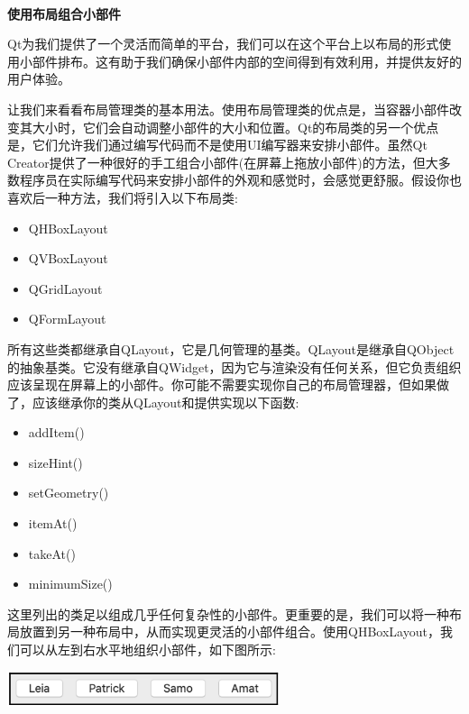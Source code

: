 \noindent\textbf{}\ \par
\textbf{使用布局组合小部件} \ \par
Qt为我们提供了一个灵活而简单的平台，我们可以在这个平台上以布局的形式使用小部件排布。这有助于我们确保小部件内部的空间得到有效利用，并提供友好的用户体验。 \par
让我们来看看布局管理类的基本用法。使用布局管理类的优点是，当容器小部件改变其大小时，它们会自动调整小部件的大小和位置。Qt的布局类的另一个优点是，它们允许我们通过编写代码而不是使用UI编写器来安排小部件。虽然Qt Creator提供了一种很好的手工组合小部件(在屏幕上拖放小部件)的方法，但大多数程序员在实际编写代码来安排小部件的外观和感觉时，会感觉更舒服。假设你也喜欢后一种方法，我们将引入以下布局类: \par

\begin{itemize}
	\item QHBoxLayout
	\item QVBoxLayout
	\item QGridLayout
	\item QFormLayout
\end{itemize}

所有这些类都继承自QLayout，它是几何管理的基类。QLayout是继承自QObject的抽象基类。它没有继承自QWidget，因为它与渲染没有任何关系，但它负责组织应该呈现在屏幕上的小部件。你可能不需要实现你自己的布局管理器，但如果做了，应该继承你的类从QLayout和提供实现以下函数: \par

\begin{itemize}
	\item addItem()
	\item sizeHint()
	\item setGeometry()
	\item itemAt()
	\item takeAt()
	\item minimumSize()
\end{itemize}

这里列出的类足以组成几乎任何复杂性的小部件。更重要的是，我们可以将一种布局放置到另一种布局中，从而实现更灵活的小部件组合。使用QHBoxLayout，我们可以从左到右水平地组织小部件，如下图所示: \par

\begin{center}
	\includegraphics[width=0.6\textwidth]{content/Section-2/Chapter-14/16}
\end{center}

